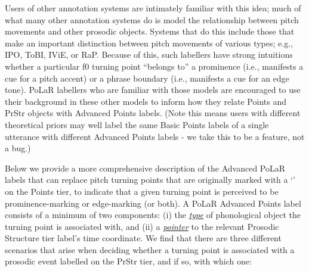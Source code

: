 Users of other annotation systems are intimately familiar with this idea; much of what many other annotation systems do is model the relationship between pitch movements and other prosodic objects. Systems that do this include those that make an important distinction between pitch movements of various types; e.g., IPO, ToBI, IViE, or RaP. Because of this, such labellers have strong intuitions whether a particular f0 turning point “belongs to” a prominence (i.e., manifests a cue for a pitch accent) or a phrase boundary (i.e., manifests a cue for an edge tone). PoLaR labellers who are familiar with those models are encouraged to use their background in these other models to inform how they relate Points and PrStr objects with Advanced Points labels. (Note this means users with different theoretical priors may well label the same Basic Points labels of a single utterance with different Advanced Points labels - we take this to be a feature, not a bug.)

Below we provide a more comprehensive description of the Advanced PoLaR labels that can replace pitch turning points that are originally marked with a ‘’ on the Points tier, to indicate that a given turning point is perceived to be prominence-marking or edge-marking (or both). A PoLaR Advanced Points label consists of a minimum of two components: (i) the \textit{\uline{type}} of phonological object the turning point is associated with, and (ii) a \textit{\uline{pointer}} to the relevant Prosodic Structure tier label’s time coordinate. We find that there are three different scenarios that arise when deciding whether a turning point is associated with a prosodic event labelled on the PrStr tier, and if so, with which one:

